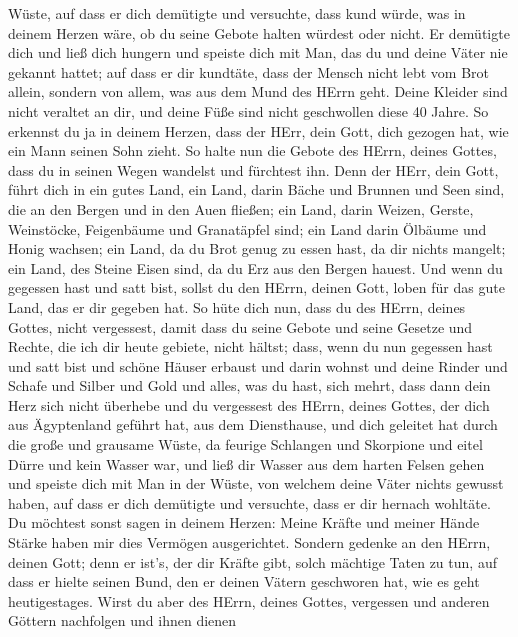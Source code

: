 Wüste, auf dass er dich demütigte und versuchte, dass kund würde, was in
deinem Herzen wäre, ob du seine Gebote halten würdest oder nicht.
 Er demütigte dich und ließ dich hungern und speiste dich
mit Man, das du und deine Väter nie gekannt hattet; auf dass er dir
kundtäte, dass der Mensch nicht lebt vom Brot allein, sondern von allem,
was aus dem Mund des HErrn geht.  Deine Kleider sind nicht
veraltet an dir, und deine Füße sind nicht geschwollen diese 40 Jahre.
 So erkennst du ja in deinem Herzen, dass der HErr, dein
Gott, dich gezogen hat, wie ein Mann seinen Sohn zieht.  So
halte nun die Gebote des HErrn, deines Gottes, dass du in seinen Wegen
wandelst und fürchtest ihn.  Denn der HErr, dein Gott, führt
dich in ein gutes Land, ein Land, darin Bäche und Brunnen und Seen sind,
die an den Bergen und in den Auen fließen;  ein Land, darin
Weizen, Gerste, Weinstöcke, Feigenbäume und Granatäpfel sind; ein Land
darin Ölbäume und Honig wachsen;  ein Land, da du Brot genug
zu essen hast, da dir nichts mangelt; ein Land, des Steine Eisen sind,
da du Erz aus den Bergen hauest.  Und wenn du gegessen hast
und satt bist, sollst du den HErrn, deinen Gott, loben für das gute
Land, das er dir gegeben hat.  So hüte dich nun, dass du
des HErrn, deines Gottes, nicht vergessest, damit dass du seine Gebote
und seine Gesetze und Rechte, die ich dir heute gebiete, nicht hältst;
 dass, wenn du nun gegessen hast und satt bist und schöne
Häuser erbaust und darin wohnst  und deine Rinder und
Schafe und Silber und Gold und alles, was du hast, sich mehrt,
 dass dann dein Herz sich nicht überhebe und du vergessest
des HErrn, deines Gottes, der dich aus Ägyptenland geführt hat, aus dem
Diensthause,  und dich geleitet hat durch die große und
grausame Wüste, da feurige Schlangen und Skorpione und eitel Dürre und
kein Wasser war, und ließ dir Wasser aus dem harten Felsen gehen
 und speiste dich mit Man in der Wüste, von welchem deine
Väter nichts gewusst haben, auf dass er dich demütigte und versuchte,
dass er dir hernach wohltäte.  Du möchtest sonst sagen in
deinem Herzen: Meine Kräfte und meiner Hände Stärke haben mir dies
Vermögen ausgerichtet.  Sondern gedenke an den HErrn,
deinen Gott; denn er ist's, der dir Kräfte gibt, solch mächtige Taten zu
tun, auf dass er hielte seinen Bund, den er deinen Vätern geschworen
hat, wie es geht heutigestages.  Wirst du aber des HErrn,
deines Gottes, vergessen und anderen Göttern nachfolgen und ihnen dienen
